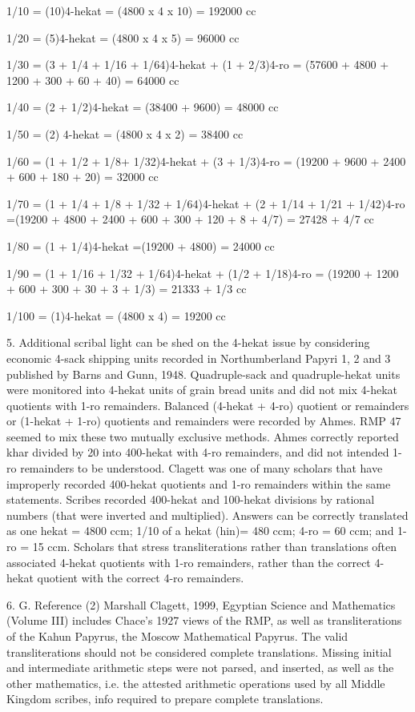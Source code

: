 \documentclass[12pt]{article}
\begin{document}
1/10 = (10)4-hekat  = (4800 x 4 x 10) =  192000 cc   

1/20 = (5)4-hekat = (4800 x 4 x 5) = 96000 cc 

1/30 = (3 + 1/4 + 1/16 + 1/64)4-hekat + (1 + 2/3)4-ro = (57600 + 4800 + 1200 + 300 + 60 + 40) = 64000 cc
           

1/40 = (2 + 1/2)4-hekat = (38400 + 9600) = 48000 cc     

1/50 = (2) 4-hekat  = (4800 x 4 x 2) = 38400 cc    

1/60 = (1 + 1/2 + 1/8+ 1/32)4-hekat + (3 + 1/3)4-ro = (19200 + 9600 + 2400 + 600 + 180 + 20) = 32000 cc

1/70 = (1 + 1/4 + 1/8 + 1/32 + 1/64)4-hekat + (2 + 1/14 + 1/21 + 1/42)4-ro =(19200 + 4800 + 2400 + 600 + 300 + 120 + 8 + 4/7) = 27428 + 4/7 cc
   
1/80 = (1 + 1/4)4-hekat =(19200 + 4800) = 24000 cc        

1/90 = (1 + 1/16 + 1/32 + 1/64)4-hekat + (1/2 + 1/18)4-ro = (19200 + 1200 + 600 + 300 + 30 + 3 + 1/3) = 21333 + 1/3 cc

1/100 = (1)4-hekat = (4800 x 4) = 19200 cc

5. Additional scribal light can be shed on the 4-hekat issue by considering economic 4-sack shipping units recorded in Northumberland Papyri 1, 2 and 3 published by Barns and Gunn, 1948. Quadruple-sack and quadruple-hekat units were monitored into 4-hekat units of grain bread units and did not mix 4-hekat quotients with 1-ro remainders. Balanced (4-hekat + 4-ro) quotient or remainders or (1-hekat + 1-ro) quotients and remainders were recorded by Ahmes. RMP 47 seemed to mix these two mutually exclusive methods. Ahmes correctly reported khar divided by 20 into 400-hekat with 4-ro remainders, and did not intended 1-ro remainders to be understood. Clagett was one of many scholars that have improperly recorded 400-hekat quotients and 1-ro remainders within the same statements. Scribes recorded 400-hekat and 100-hekat divisions by rational numbers (that were inverted and multiplied). Answers can be correctly translated as one hekat = 4800 ccm;  1/10 of a hekat (hin)= 480 ccm;  4-ro = 60 ccm; and 1-ro = 15 ccm. Scholars that stress transliterations rather than translations often associated 4-hekat quotients with 1-ro remainders, rather than the correct 4-hekat quotient with the correct 4-ro remainders.

6. G. Reference (2) Marshall Clagett, 1999, Egyptian Science and Mathematics (Volume III) includes Chace’s 1927 views of the RMP, as well as transliterations of the Kahun Papyrus, the Moscow Mathematical Papyrus. The valid transliterations should not be considered complete translations. Missing initial and intermediate arithmetic steps were not parsed, and inserted, as well as the other mathematics, i.e. the attested arithmetic operations used by all Middle Kingdom scribes, info required to prepare complete translations.
\end{document}
